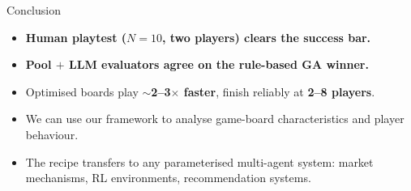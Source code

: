 \documentclass[10pt,aspectratio=169]{beamer}
\begin{document}
\begin{frame}{Conclusion}
  \begin{itemize}\footnotesize\itemsep=0.55em
    \item \textbf{Human playtest ($N{=}10$, two players) clears the success bar.}
    \item \textbf{Pool $+$ LLM evaluators agree on the rule-based GA winner.}
    \item Optimised boards play \textbf{$\sim$2--3$\times$ faster}, finish reliably at \textbf{2--8 players}.
    \item We can use our framework to analyse game-board characteristics and player behaviour.
    \item The recipe transfers to any parameterised multi-agent system: market mechanisms, RL environments, recommendation systems.
  \end{itemize}
\end{frame}
\end{document}
